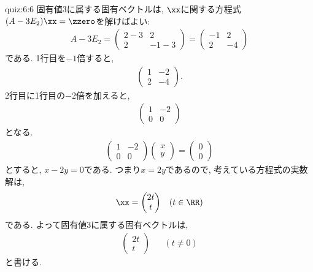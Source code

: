 \begin{answerof}{quiz:6:6}
  固有値$3$に属する固有ベクトルは,
  $\xx$に関する方程式$(A-3E_2)\xx=\zzero$を解けばよい:
  \begin{align*}
    A-3E_2=
    \begin{pmatrix}
      2-3&2\\2&-1-3
    \end{pmatrix}
    =
    \begin{pmatrix}
      -1&2\\2&-4
    \end{pmatrix}
  \end{align*}
  である.  1行目を$-1$倍すると,
  \begin{align*}
    \begin{pmatrix}
      1&-2\\2&-4
    \end{pmatrix}.
  \end{align*}
  2行目に1行目の$-2$倍を加えると,
  \begin{align*}
    \begin{pmatrix}
      1&-2\\0&0
    \end{pmatrix}
  \end{align*}
  となる.
  \begin{align*}
    \begin{pmatrix}
      1&-2\\0&0
    \end{pmatrix}
    \begin{pmatrix}
      x\\y
    \end{pmatrix}=
    \begin{pmatrix}
      0\\0
    \end{pmatrix}
  \end{align*}
  とすると, $x-2y=0$である.
  つまり$x=2y$であるので, 考えている方程式の実数解は,
  \begin{align*}
    \xx=
    \begin{pmatrix}
      2t\\t
    \end{pmatrix}&&(t\in\RR)
  \end{align*}
  である.
  よって固有値$3$に属する固有ベクトルは,
  \begin{align*}
    \begin{pmatrix}
      2t\\t
    \end{pmatrix}&&(t\neq 0)
  \end{align*}
  と書ける.


\end{answerof}
